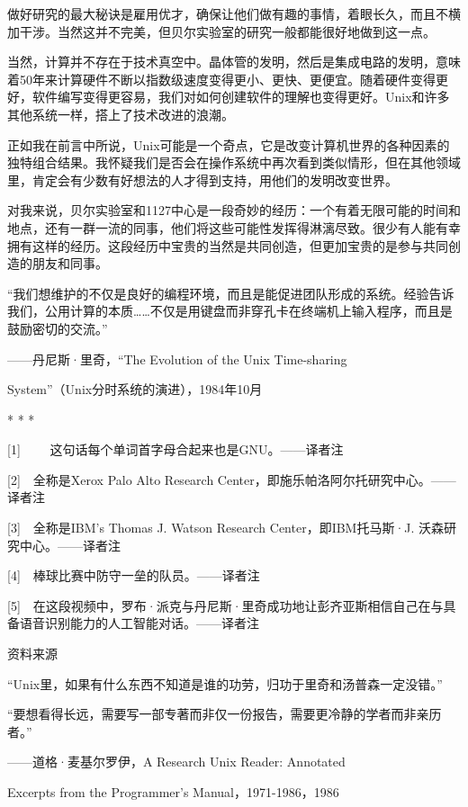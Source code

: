 \documentclass[a4paper,12pt,UTF8,twoside]{ctexbook}
\begin{document}
做好研究的最大秘诀是雇用优才，确保让他们做有趣的事情，着眼长久，而且不横加干涉。当然这并不完美，但贝尔实验室的研究一般都能很好地做到这一点。

当然，计算并不存在于技术真空中。晶体管的发明，然后是集成电路的发明，意味着50年来计算硬件不断以指数级速度变得更小、更快、更便宜。随着硬件变得更好，软件编写变得更容易，我们对如何创建软件的理解也变得更好。Unix和许多其他系统一样，搭上了技术改进的浪潮。

正如我在前言中所说，Unix可能是一个奇点，它是改变计算机世界的各种因素的独特组合结果。我怀疑我们是否会在操作系统中再次看到类似情形，但在其他领域里，肯定会有少数有好想法的人才得到支持，用他们的发明改变世界。

对我来说，贝尔实验室和1127中心是一段奇妙的经历：一个有着无限可能的时间和地点，还有一群一流的同事，他们将这些可能性发挥得淋漓尽致。很少有人能有幸拥有这样的经历。这段经历中宝贵的当然是共同创造，但更加宝贵的是参与共同创造的朋友和同事。

“我们想维护的不仅是良好的编程环境，而且是能促进团队形成的系统。经验告诉我们，公用计算的本质……不仅是用键盘而非穿孔卡在终端机上输入程序，而且是鼓励密切的交流。”

——丹尼斯·里奇，“The Evolution of the Unix Time-sharing

System”（Unix分时系统的演进），1984年10月





* * *



[1]　 　这句话每个单词首字母合起来也是GNU。——译者注

[2]　全称是Xerox Palo Alto Research Center，即施乐帕洛阿尔托研究中心。——译者注

[3]　全称是IBM’s Thomas J. Watson Research Center，即IBM托马斯·J. 沃森研究中心。——译者注

[4]　棒球比赛中防守一垒的队员。——译者注

[5]　在这段视频中，罗布·派克与丹尼斯·里奇成功地让彭齐亚斯相信自己在与具备语音识别能力的人工智能对话。——译者注





资料来源


“Unix里，如果有什么东西不知道是谁的功劳，归功于里奇和汤普森一定没错。”

“要想看得长远，需要写一部专著而非仅一份报告，需要更冷静的学者而非亲历者。”

——道格·麦基尔罗伊，A Research Unix Reader: Annotated

Excerpts from the Programmer’s Manual，1971-1986，1986
\end{document}
